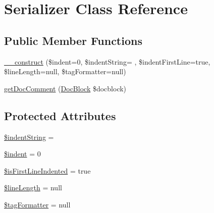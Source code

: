 \hypertarget{classphp_documentor_1_1_reflection_1_1_doc_block_1_1_serializer}{}\section{Serializer Class Reference}
\label{classphp_documentor_1_1_reflection_1_1_doc_block_1_1_serializer}
\subsection*{Public Member Functions}
\begin{DoxyCompactItemize}
\item 
\mbox{\hyperlink{classphp_documentor_1_1_reflection_1_1_doc_block_1_1_serializer_a4c0b0e85d4fd9ee49575e9a1b6d98d28}{\+\_\+\+\_\+construct}} (\$indent=0, \$indent\+String=\textquotesingle{} \textquotesingle{}, \$indent\+First\+Line=true, \$line\+Length=null, \$tag\+Formatter=null)
\item 
\mbox{\hyperlink{classphp_documentor_1_1_reflection_1_1_doc_block_1_1_serializer_a4a3c6ba9d8027705aea0acbb893a97f3}{get\+Doc\+Comment}} (\mbox{\hyperlink{classphp_documentor_1_1_reflection_1_1_doc_block}{Doc\+Block}} \$docblock)
\end{DoxyCompactItemize}
\subsection*{Protected Attributes}
\begin{DoxyCompactItemize}
\item 
\mbox{\hyperlink{classphp_documentor_1_1_reflection_1_1_doc_block_1_1_serializer_ae16145a8ad23b6f84c1ef7fe8cc10a5f}{\$indent\+String}} = \textquotesingle{} \textquotesingle{}
\item 
\mbox{\hyperlink{classphp_documentor_1_1_reflection_1_1_doc_block_1_1_serializer_af8f6a5696fad56b194d5af8080233e71}{\$indent}} = 0
\item 
\mbox{\hyperlink{classphp_documentor_1_1_reflection_1_1_doc_block_1_1_serializer_a8962065af15a4c91e0049df0d815eeec}{\$is\+First\+Line\+Indented}} = true
\item 
\mbox{\hyperlink{classphp_documentor_1_1_reflection_1_1_doc_block_1_1_serializer_a756307533aa25a76c496ef69c4721562}{\$line\+Length}} = null
\item 
\mbox{\hyperlink{classphp_documentor_1_1_reflection_1_1_doc_block_1_1_serializer_ad6d32c40a8ac191a791a5ff620044510}{\$tag\+Formatter}} = null
\end{DoxyCompactItemize}


